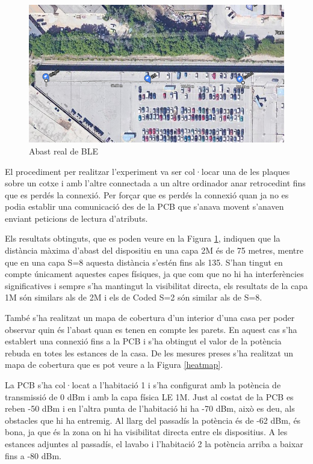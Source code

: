\begin{figure}[!h]
	\begin{center}
		\includegraphics[width=\textwidth]{./images/prova_abast.png}
		\caption{Abast real de BLE}
		\label{abast}
	\end{center}
\end{figure}

El procediment per realitzar l'experiment va ser col·locar una de les plaques sobre un cotxe i amb l'altre connectada a un altre ordinador anar retrocedint fins que es perdés la connexió.
Per forçar que es perdés la connexió quan ja no es podia establir una comunicació des de la PCB que s'anava movent s'anaven enviant peticions de lectura d'atributs.

Els resultats obtinguts, que es poden veure en la Figura \ref{abast}, indiquen que la distància màxima d'abast del dispositiu en una capa 2M és de 75 metres, mentre que en una capa S=8 aquesta distància s'estén fins als 135.
S'han tingut en compte únicament aquestes capes físiques, ja que com que no hi ha interferències significatives i sempre s'ha mantingut la visibilitat directa, els resultats de la capa 1M són similars als de 2M i els de Coded S=2 són similar als de S=8.
\newpage

També s'ha realitzat un mapa de cobertura d'un interior d'una casa per poder observar quin és l'abast quan es tenen en compte les parets.
En aquest cas s'ha establert una connexió fins a la PCB i s'ha obtingut el valor de la potència rebuda en totes les estances de la casa. De les mesures preses s'ha realitzat un mapa de cobertura que es pot veure a la Figura \ref{heatmap}.

La PCB s'ha col·locat a l'habitació 1 i s'ha configurat amb la potència de transmissió de 0 dBm i amb la capa física LE 1M.
Just al costat de la PCB es reben -50 dBm i en l'altra punta de l'habitació hi ha -70 dBm, això es deu, als obstacles que hi ha entremig.
Al llarg del passadís la potència és de -62 dBm, és bona, ja que és la zona on hi ha visibilitat directa entre els dispositius.
A les estances adjuntes al passadís, el lavabo i l'habitació 2 la potència arriba a baixar fins a -80 dBm.

